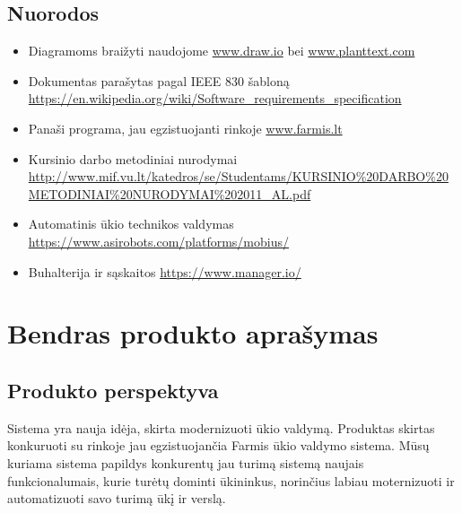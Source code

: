 \documentclass[oneside]{VUMIFPSkursinis}
\begin{document}
\subsection{Nuorodos}
\begin{itemize}
	\item Diagramoms braižyti naudojome \url{www.draw.io} bei \url{www.planttext.com}
	\item Dokumentas parašytas pagal IEEE 830 šabloną \url{https://en.wikipedia.org/wiki/Software_requirements_specification}
	\item Panaši programa, jau egzistuojanti rinkoje \url{www.farmis.lt}
	\item Kursinio darbo metodiniai nurodymai \url{http://www.mif.vu.lt/katedros/se/Studentams/KURSINIO%20DARBO%20METODINIAI%20NURODYMAI%202011_AL.pdf}
	\item Automatinis ūkio technikos valdymas \url{https://www.asirobots.com/platforms/mobius/}
	\item Buhalterija ir sąskaitos \url{https://www.manager.io/}
\end{itemize}

\section{Bendras produkto aprašymas}
\subsection{Produkto perspektyva}
Sistema yra nauja idėja, skirta modernizuoti ūkio valdymą. Produktas skirtas konkuruoti su rinkoje jau egzistuojančia Farmis ūkio valdymo sistema. Mūsų kuriama sistema papildys konkurentų jau turimą sistemą naujais funkcionalumais, kurie turėtų dominti ūkininkus, norinčius labiau moternizuoti ir automatizuoti savo turimą ūkį ir verslą. 
\end{document}
